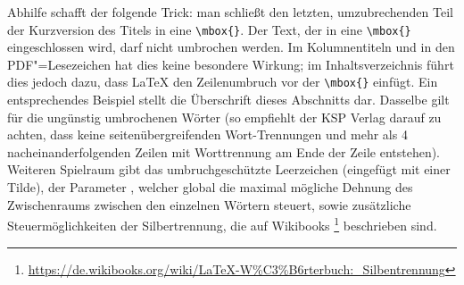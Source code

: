 Abhilfe schafft der folgende Trick:
man schließt den letzten, umzubrechenden Teil der Kurzversion des Titels in eine \verb+\mbox{}+.
Der Text, der in eine \verb+\mbox{}+ eingeschlossen wird, darf nicht umbrochen werden.
Im Kolumnentiteln und in den PDF"=Lesezeichen hat dies keine besondere Wirkung;
im Inhaltsverzeichnis führt dies jedoch dazu, dass \LaTeX{} den Zeilenumbruch vor der \verb+\mbox{}+ einfügt.
Ein entsprechendes Beispiel stellt die Überschrift dieses Abschnitts dar.
Dasselbe gilt für die ungünstig umbrochenen Wörter
(so empfiehlt der KSP Verlag darauf zu achten, dass keine seitenübergreifenden Wort-Trennungen und mehr als 4 nacheinanderfolgenden Zeilen mit Worttrennung am Ende der Zeile entstehen).
Weiteren Spielraum gibt das umbruchgeschützte Leerzeichen (eingefügt mit einer Tilde),
der Parameter , welcher global die maximal mögliche Dehnung des Zwischenraums zwischen den einzelnen Wörtern steuert,
sowie zusätzliche Steuermöglichkeiten der Silbertrennung, die auf Wikibooks%
\footnote{\url{https://de.wikibooks.org/wiki/LaTeX-W%C3%B6rterbuch:_Silbentrennung}}
beschrieben sind.